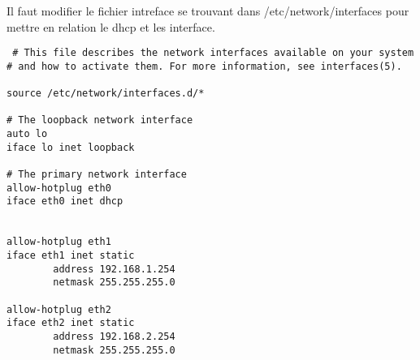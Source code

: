 \documentclass[a4paper,12pt]{article}
\begin{document}
Il faut modifier le fichier intreface se trouvant dans /etc/network/interfaces pour mettre en relation le dhcp et les interface.
\begin{verbatim}
 # This file describes the network interfaces available on your system
# and how to activate them. For more information, see interfaces(5).

source /etc/network/interfaces.d/*

# The loopback network interface
auto lo
iface lo inet loopback

# The primary network interface
allow-hotplug eth0
iface eth0 inet dhcp


allow-hotplug eth1
iface eth1 inet static
        address 192.168.1.254
        netmask 255.255.255.0

allow-hotplug eth2
iface eth2 inet static
        address 192.168.2.254
        netmask 255.255.255.0

\end{verbatim}
\end{document}
